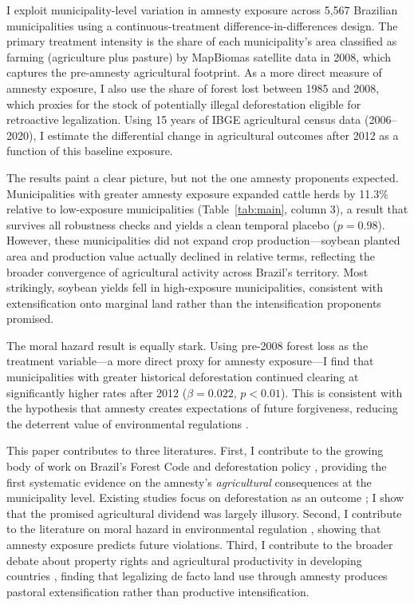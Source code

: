 \documentclass[12pt]{article}
\begin{document}
I exploit municipality-level variation in amnesty exposure across 5,567 Brazilian municipalities using a continuous-treatment difference-in-differences design. The primary treatment intensity is the share of each municipality's area classified as farming (agriculture plus pasture) by MapBiomas satellite data in 2008, which captures the pre-amnesty agricultural footprint. As a more direct measure of amnesty exposure, I also use the share of forest lost between 1985 and 2008, which proxies for the stock of potentially illegal deforestation eligible for retroactive legalization. Using 15 years of IBGE agricultural census data (2006--2020), I estimate the differential change in agricultural outcomes after 2012 as a function of this baseline exposure.

The results paint a clear picture, but not the one amnesty proponents expected. Municipalities with greater amnesty exposure expanded cattle herds by 11.3\% relative to low-exposure municipalities (Table~\ref{tab:main}, column 3), a result that survives all robustness checks and yields a clean temporal placebo ($p=0.98$). However, these municipalities did not expand crop production---soybean planted area and production value actually declined in relative terms, reflecting the broader convergence of agricultural activity across Brazil's territory. Most strikingly, soybean yields fell in high-exposure municipalities, consistent with extensification onto marginal land rather than the intensification proponents promised.

The moral hazard result is equally stark. Using pre-2008 forest loss as the treatment variable---a more direct proxy for amnesty exposure---I find that municipalities with greater historical deforestation continued clearing at significantly higher rates after 2012 ($\beta = 0.022$, $p < 0.01$). This is consistent with the hypothesis that amnesty creates expectations of future forgiveness, reducing the deterrent value of environmental regulations \citep{assuncao2015deterring, burgess2012political}.

This paper contributes to three literatures. First, I contribute to the growing body of work on Brazil's Forest Code and deforestation policy \citep{assuncao2017effect, gibbs2015brazil, koch2019slippery}, providing the first systematic evidence on the amnesty's \emph{agricultural} consequences at the municipality level. Existing studies focus on deforestation as an outcome \citep{soares2014forest}; I show that the promised agricultural dividend was largely illusory. Second, I contribute to the literature on moral hazard in environmental regulation \citep{pfaff2007big, chomitz2007costs}, showing that amnesty exposure predicts future violations. Third, I contribute to the broader debate about property rights and agricultural productivity in developing countries \citep{besley1995property, goldstein2008returns}, finding that legalizing de facto land use through amnesty produces pastoral extensification rather than productive intensification.
\end{document}
